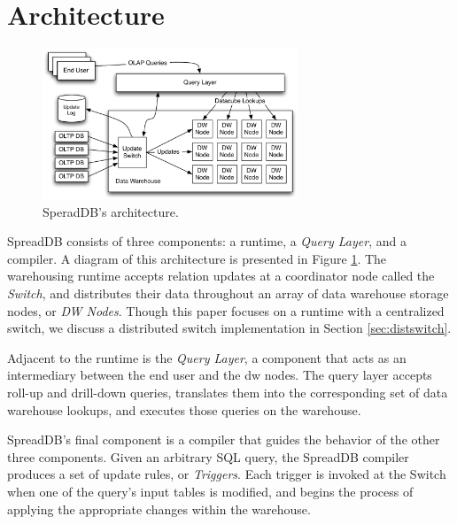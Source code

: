 \documentclass{sig-alternate}
\begin{document}
\section{Architecture}
\label{sec:architecture}
\begin{figure}
\begin{center}
\includegraphics[width=3in]{images/Architecture.pdf}
\caption{SperadDB's architecture.}
\label{fig:arch}
\end{center}
\end{figure}
SpreadDB consists of three components: a runtime, a \textit{Query Layer}, and a compiler.  A diagram of this architecture is presented in Figure \ref{fig:arch}.  The warehousing runtime accepts relation updates at a coordinator node called the \textit{Switch}, and distributes their data throughout an array of data warehouse storage nodes, or \textit{DW Nodes}.  Though this paper focuses on a runtime with a centralized switch, we discuss a distributed switch implementation in Section \ref{sec:distswitch}.

Adjacent to the runtime is the \textit{Query Layer}, a component that acts as an intermediary between the end user and the dw nodes.  The query layer accepts roll-up and drill-down queries, translates them into the corresponding set of data warehouse lookups, and executes those queries on the warehouse.

SpreadDB's final component is a compiler that guides the behavior of the other three components.  Given an arbitrary SQL query, the SpreadDB compiler produces a set of update rules, or \textit{Triggers}.  Each trigger is invoked at the Switch when one of the query's input tables is modified, and begins the process of applying the appropriate changes within the warehouse.  
\end{document}
